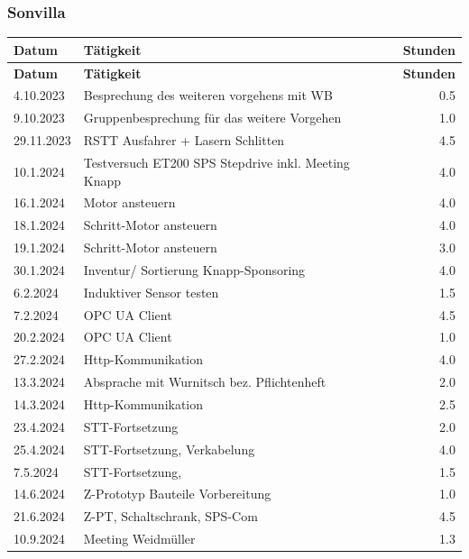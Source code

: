 \subsubsection{Sonvilla}
\begin{longtable}{|l|p{10cm}|r|}
    \hline
    \textbf{Datum} & \textbf{Tätigkeit} & \textbf{Stunden} \\
    \hline
    \endfirsthead

    \hline
    \textbf{Datum} & \textbf{Tätigkeit} & \textbf{Stunden} \\
    \hline
    \endhead

    \hline
    \endfoot

    \hline
    \endlastfoot

    4.10.2023	&	Besprechung des weiteren vorgehens mit WB	&	0.5 \\
    9.10.2023	&	Gruppenbesprechung für das weitere Vorgehen	&	1.0 \\
    29.11.2023	&	RSTT Ausfahrer + Lasern Schlitten	&	4.5 \\
    10.1.2024	&	Testversuch ET200 SPS Stepdrive inkl. Meeting Knapp	&	4.0 \\
    16.1.2024	&	Motor ansteuern	&	4.0 \\
    18.1.2024	&	Schritt-Motor ansteuern	&	4.0 \\
    19.1.2024	&	Schritt-Motor ansteuern	&	3.0 \\
    30.1.2024	&	Inventur/ Sortierung Knapp-Sponsoring	&	4.0 \\
    6.2.2024	&	Induktiver Sensor testen	&	1.5 \\
    7.2.2024	&	OPC UA Client	&	4.5 \\
    20.2.2024	&   OPC UA Client 	&	1.0 \\
    27.2.2024	&	Http-Kommunikation	&	4.0 \\
    13.3.2024	&	Absprache mit Wurnitsch bez. Pflichtenheft	&	2.0 \\
    14.3.2024	&	Http-Kommunikation	&	2.5 \\
    23.4.2024	&	STT-Fortsetzung 	&	2.0 \\
    25.4.2024	&	STT-Fortsetzung, Verkabelung	&	4.0 \\
    7.5.2024	&	STT-Fortsetzung,	&	1.5 \\
    14.6.2024	&	Z-Prototyp Bauteile Vorbereitung	&	1.0 \\
    21.6.2024	&	Z-PT, Schaltschrank, SPS-Com	&	4.5 \\
    10.9.2024	&	Meeting Weidmüller	&	1.3 \\

\end{longtable}
